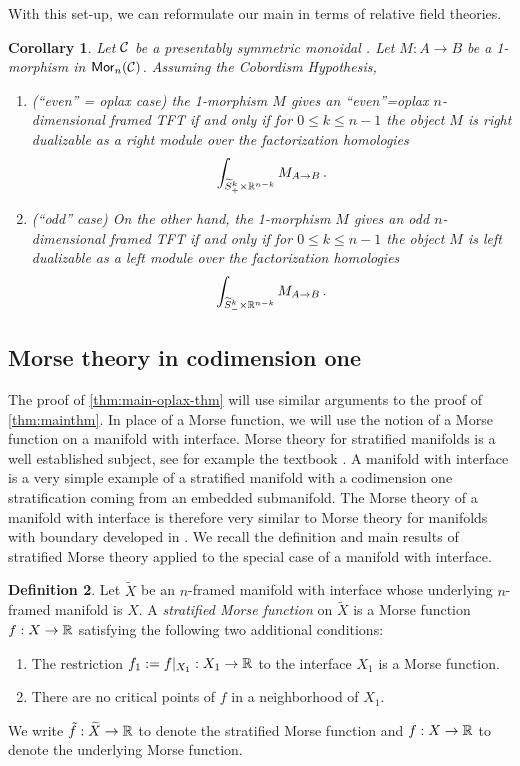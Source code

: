 \documentclass[10pt, reqno, twoside
, final
]{amsart}
\numberwithin{equation}{subsection}%
\theoremstyle{definition}
\newtheorem{defn}{Definition}[subsection]
\theoremstyle{definition}
\theoremstyle{definition}
\theoremstyle{definition}
\theoremstyle{definition}
\theoremstyle{definition}
\theoremstyle{definition}
\theoremstyle{definition}
\theoremstyle{definition}
\theoremstyle{plain}
\theoremstyle{definition}
\theoremstyle{plain}
\theoremstyle{definition}
\theoremstyle{plain}
\newtheorem{cor}[defn]{Corollary}
\theoremstyle{definition}
\theoremstyle{definition}
\theoremstyle{plain}
\theoremstyle{plain}
\theoremstyle{definition}
\theoremstyle{plain}
\theoremstyle{plain}
\theoremstyle{plain}
\begin{document}
With this set-up, we can reformulate our main  in terms of relative field theories.
\begin{cor}\label{cor:main-oplax-thm}
Let $\mathcal{C}$ be a presentably symmetric monoidal \infcatt. Let $M:A\to B$ be a 1-morphism in $\mathsf{Mor}_n(\mathcal{C})$. Assuming the Cobordism Hypothesis,
 \begin{enumerate}
 \item {\em (``even'' = oplax case)}  the 1-morphism $M$ gives an ``even''=oplax $n$-dimensional framed TFT if and only if for $0\leq k \leq n-1$ the object $M$ is right dualizable as a right module over the factorization homologies 
\[  \int_{\widetilde{S}^{k}_{+} \times \mathbb{R}^{n-k}} M_{A\to B} \,.\] 
\item {\em (``odd'' case)}
On the other hand, the 1-morphism $M$ gives an odd $n$-dimensional framed TFT if and only if for $0\leq k \leq n-1$ the object $M$ is left dualizable as a left module over the factorization homologies 
\[  \int_{\widetilde{S}^{k}_{-}\times \mathbb{R}^{n-k}} M_{A\to B} \,. \] 
 \end{enumerate}
\end{cor}




\subsection{Morse theory in codimension one}

The proof of \cref{thm:main-oplax-thm} will use similar arguments to the proof of \cref{thm:mainthm}. In place of a Morse function, we will use the notion of a Morse function on a manifold with interface. Morse theory for stratified manifolds is a well established subject, see for example the textbook \cite{GM}. A manifold with interface is a very simple example of a stratified manifold with a codimension one stratification coming from an embedded submanifold. The Morse theory of a manifold with interface is therefore very similar to Morse theory for manifolds with boundary developed in \cite{JR72,Bra74,Haj}. We recall the definition and main results of stratified Morse theory applied to the special case of a manifold with interface.

\begin{defn}\label{def:strat-morse}
Let $\widetilde{X}$ be an $n$-framed manifold with interface whose underlying $n$-framed manifold is $X$. A \emph{stratified Morse function} on $\widetilde{X}$ is a Morse function $f:X \to \mathbb{R}$ satisfying the following two additional conditions:
\begin{enumerate}
    \item The restriction $f_1:=f|_{X_1}:X_1 \to \mathbb{R}$ to the interface $X_1$ is a Morse function.
    \item There are no critical points of $f$ in a neighborhood of $X_1$.
\end{enumerate}
We write $\tilde{f}:\widetilde{X} \to \mathbb{R}$ to denote the stratified Morse function and $f:X\to \mathbb{R}$ to denote the underlying Morse function.
\end{defn}
\end{document}
